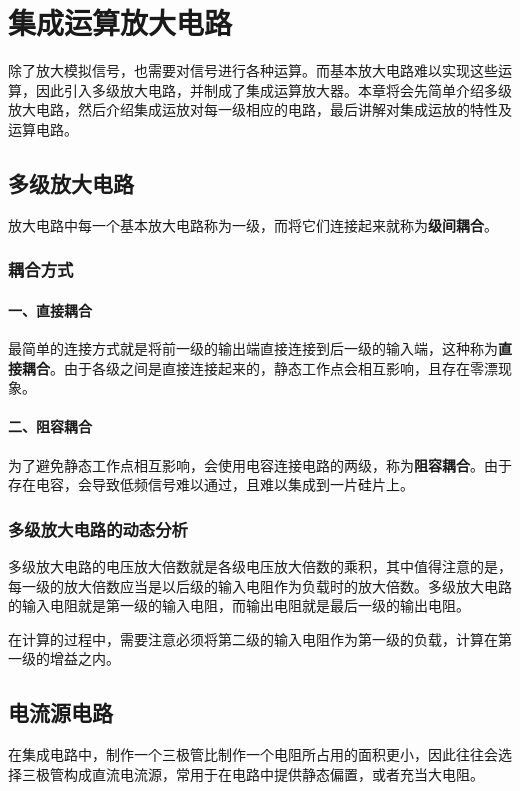 \chapter{集成运算放大电路}
除了放大模拟信号，也需要对信号进行各种运算。而基本放大电路难以实现这些运算，因此引入多级放大电路，并制成了集成运算放大器。本章将会先简单介绍多级放大电路，然后介绍集成运放对每一级相应的电路，最后讲解对集成运放的特性及运算电路。

\section{多级放大电路}
放大电路中每一个基本放大电路称为一级，而将它们连接起来就称为\textbf{级间耦合}。

\subsection{耦合方式}

\subsubsection{一、直接耦合}
最简单的连接方式就是将前一级的输出端直接连接到后一级的输入端，这种称为\textbf{直接耦合}。由于各级之间是直接连接起来的，静态工作点会相互影响，且存在零漂现象。

\subsubsection{二、阻容耦合}
为了避免静态工作点相互影响，会使用电容连接电路的两级，称为\textbf{阻容耦合}。由于存在电容，会导致低频信号难以通过，且难以集成到一片硅片上。

\subsection{多级放大电路的动态分析}
多级放大电路的电压放大倍数就是各级电压放大倍数的乘积，其中值得注意的是，每一级的放大倍数应当是以后级的输入电阻作为负载时的放大倍数。多级放大电路的输入电阻就是第一级的输入电阻，而输出电阻就是最后一级的输出电阻。

在计算的过程中，需要注意必须将第二级的输入电阻作为第一级的负载，计算在第一级的增益之内。

\section{电流源电路}
在集成电路中，制作一个三极管比制作一个电阻所占用的面积更小，因此往往会选择三极管构成直流电流源，常用于在电路中提供静态偏置，或者充当大电阻。

